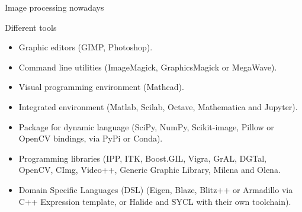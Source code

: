\documentclass[12pt,aspectratio=169]{beamer}
\begin{document}
\begin{frame}[fragile]{Image processing nowadays}
  \begin{alertblock}{Different tools}
    \begin{itemize}
      \item Graphic editors (GIMP, Photoshop).
      \item Command line utilities (ImageMagick, GraphicsMagick or MegaWave).
      \item Visual programming environment (Mathcad).
      \item Integrated environment (Matlab, Scilab, Octave, Mathematica and Jupyter).
      \item Package for dynamic language (SciPy, NumPy, Scikit-image, Pillow or OpenCV bindings, via PyPi or Conda).
      \item Programming libraries (IPP, ITK, Boost.GIL, Vigra, GrAL, DGTal, OpenCV, CImg, Video++, Generic Graphic
            Library, Milena and Olena.
      \item Domain Specific Languages (DSL) (Eigen, Blaze, Blitz++ or Armadillo via C++ Expression template, or Halide
            and SYCL with their own toolchain).
    \end{itemize}
  \end{alertblock}
\end{frame}
\end{document}
